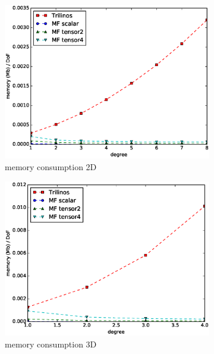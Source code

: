 \documentclass[preprint,12pt,times]{elsarticle}
\begin{document}
\begin{figure}[!ht]
  \begin{subfigure}[b]{0.45\textwidth}
      \centering
      \includegraphics[width=\textwidth]{IWR_memory2d.eps}
      \caption{memory consumption 2D}
      \label{fig:benchmark_miehe_IWR_memory2}
  \end{subfigure}
  \begin{subfigure}[b]{0.45\textwidth}
    \centering
    \includegraphics[width=\textwidth]{IWR_memory3d.eps}
    \caption{memory consumption 3D}
    \label{fig:benchmark_miehe_IWR_memory3}
  \end{subfigure}
  ~
  \begin{subfigure}[b]{0.45\textwidth}
    \centering

\end{subfigure}
\end{figure}
\end{document}
